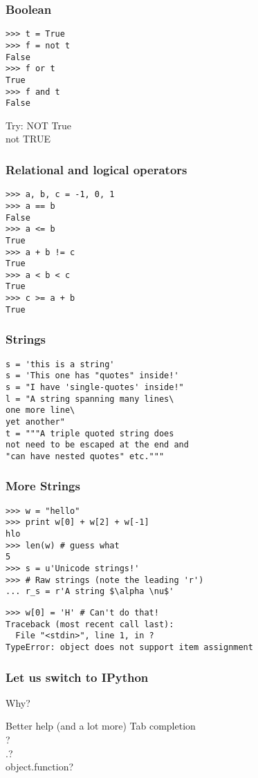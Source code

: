 \documentclass[14pt,compress]{beamer}
\begin{document}
\begin{frame}[fragile]
  \frametitle{Boolean}
  \begin{lstlisting}
>>> t = True
>>> f = not t
False
>>> f or t
True
>>> f and t
False
  \end{lstlisting}
  \begin{block}{Try:}
  NOT True\\
  not TRUE
  \end{block}
\end{frame}


\begin{frame}[fragile]
  \frametitle{Relational and logical operators}
  \begin{lstlisting}
>>> a, b, c = -1, 0, 1
>>> a == b
False
>>> a <= b 
True
>>> a + b != c
True
>>> a < b < c
True
>>> c >= a + b
True
  \end{lstlisting}
\end{frame}

\begin{frame}[fragile]
  \frametitle{Strings}
  \begin{lstlisting}
s = 'this is a string'
s = 'This one has "quotes" inside!'
s = "I have 'single-quotes' inside!"
l = "A string spanning many lines\
one more line\
yet another"
t = """A triple quoted string does
not need to be escaped at the end and 
"can have nested quotes" etc."""
  \end{lstlisting}
\end{frame}

\begin{frame}[fragile]
  \frametitle{More Strings}
  \vspace*{-0.2in}
  \begin{lstlisting}
>>> w = "hello"    
>>> print w[0] + w[2] + w[-1]
hlo
>>> len(w) # guess what
5
>>> s = u'Unicode strings!'
>>> # Raw strings (note the leading 'r')
... r_s = r'A string $\alpha \nu$'
  \end{lstlisting}
\pause
  \begin{lstlisting}
>>> w[0] = 'H' # Can't do that!
Traceback (most recent call last):
  File "<stdin>", line 1, in ?
TypeError: object does not support item assignment
  \end{lstlisting}
\end{frame}

\begin{frame}
  \frametitle{Let us switch to IPython}
  Why?
  \begin{block}
    {Better help (and a lot more)}
    Tab completion\\
    ?\\
    .?\\
    object.function?
  \end{block}
\end{frame}
\end{document}
